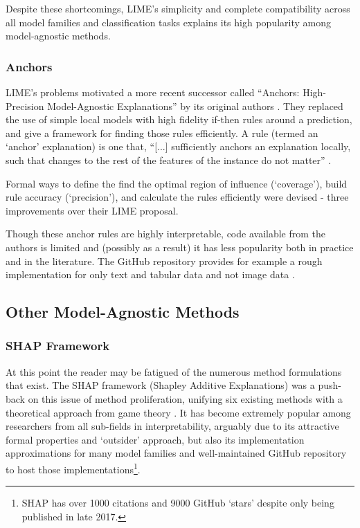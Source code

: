 \documentclass[main]{subfiles}
\begin{document}
Despite these shortcomings, LIME's simplicity and complete compatibility across all model families and classification tasks explains its high popularity among model-agnostic methods.

\subsubsection{Anchors}

LIME's problems motivated a more recent successor called ``Anchors: High-Precision Model-Agnostic Explanations'' by its original authors \cite{anchors}. They replaced the use of simple local models with high fidelity if-then rules around a prediction, and give a framework for finding those rules efficiently. A rule (termed an `anchor' explanation) is one that, ``[...] sufficiently anchors an explanation locally, such that changes to the rest of the features of the instance do not matter'' \cite{anchors}. 

Formal ways to define the find the optimal region of influence (`coverage'), build rule accuracy (`precision'), and calculate the rules efficiently were devised - three improvements over their LIME proposal.

Though these anchor rules are highly interpretable, code available from the authors is limited and (possibly as a result) it has less popularity both in practice and in the literature. The GitHub repository provides for example a rough implementation for only text and tabular data and not image data \cite{anchorsrepo}.

\subsection{Other Model-Agnostic Methods}

\subsubsection{SHAP Framework}

At this point the reader may be fatigued of the numerous method formulations that exist. The SHAP framework (Shapley Additive Explanations) was a push-back on this issue of method proliferation, unifying six existing methods with a theoretical approach from game theory \cite{shap}. It has become extremely popular among researchers from all sub-fields in interpretability, arguably due to its attractive formal properties and `outsider' approach, but also its implementation approximations for many model families and well-maintained GitHub repository to host those implementations\footnote{SHAP has over 1000 citations and 9000 GitHub `stars' despite only being published in late 2017.}. 
\end{document}
